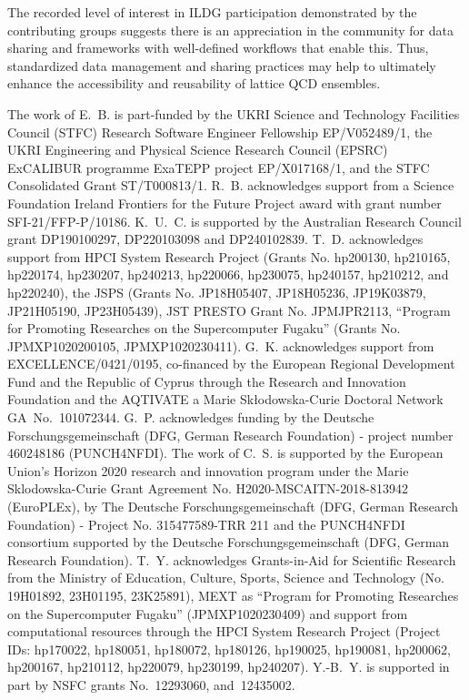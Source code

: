 \documentclass[a4paper,11pt]{article}
\begin{document}
The recorded level of interest in ILDG participation demonstrated by
the contributing groups suggests there is an appreciation in the
community for data sharing and frameworks with well-defined workflows
that enable this. Thus, standardized data management and sharing
practices may help to ultimately enhance the accessibility and
reusability of lattice QCD ensembles.

\acknowledgments

The work of E.~B. is part-funded by the UKRI Science and Technology
Facilities Council (STFC) Research Software Engineer Fellowship
EP/V052489/1, the UKRI Engineering and Physical Science Research
Council (EPSRC) ExCALIBUR programme ExaTEPP project EP/X017168/1, and
the STFC Consolidated Grant ST/T000813/1. R.~B. acknowledges support
from a Science Foundation Ireland Frontiers for the Future Project
award with grant number SFI-21/FFP-P/10186. K.~U.~C. is supported by
the Australian Research Council grant DP190100297, DP220103098 and
DP240102839. T.~D. acknowledges support from HPCI System Research
Project (Grants No. hp200130, hp210165, hp220174, hp230207, hp240213,
hp220066, hp230075, hp240157, hp210212, and hp220240), the JSPS
(Grants No. JP18H05407, JP18H05236, JP19K03879, JP21H05190,
JP23H05439), JST PRESTO Grant No. JPMJPR2113, ``Program for Promoting
Researches on the Supercomputer Fugaku'' (Grants No. JPMXP1020200105,
JPMXP1020230411). G.~K. acknowledges support from
EXCELLENCE/0421/0195, co-financed by the European Regional Development
Fund and the Republic of Cyprus through the Research and Innovation
Foundation and the AQTIVATE a Marie Sk\l{}odowska-Curie Doctoral
Network GA~No.~101072344.  G.~P. acknowledges funding by the Deutsche
Forschungsgemeinschaft (DFG, German Research Foundation) - project
number 460248186 (PUNCH4NFDI). The work of C.~S. is supported by the
European Union's Horizon 2020 research and innovation program under
the Marie Sklodowska-Curie Grant Agreement
No. H2020-MSCAITN-2018-813942 (EuroPLEx), by The Deutsche
Forschungsgemeinschaft (DFG, German Research Foundation) - Project
No. 315477589-TRR 211 and the PUNCH4NFDI consortium supported by the
Deutsche Forschungsgemeinschaft (DFG, German Research
Foundation). T.~Y.  acknowledges Grants-in-Aid for Scientific Research
from the Ministry of Education, Culture, Sports, Science and
Technology (No. 19H01892, 23H01195, 23K25891), MEXT as ``Program for
Promoting Researches on the Supercomputer Fugaku'' (JPMXP1020230409)
and support from computational resources through the HPCI System
Research Project (Project IDs: hp170022, hp180051, hp180072, hp180126,
hp190025, hp190081, hp200062, hp200167, hp210112, hp220079, hp230199,
hp240207). Y.-B.~Y. is supported in part by NSFC grants No.~12293060,
and~12435002.
\end{document}
